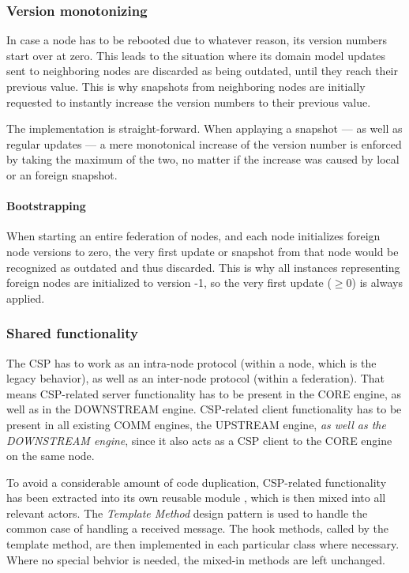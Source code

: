 \subsubsection{Version monotonizing}
In case a node has to be rebooted due to whatever reason, its version numbers
start over at zero.
This leads to the situation where its domain model updates sent to neighboring
nodes are discarded as being outdated, until they reach their previous value.
This is why snapshots from neighboring nodes are initially requested to
instantly increase the version numbers to their previous value.

The implementation is straight-forward. When applaying a snapshot --- as well as regular
updates --- a mere monotonical increase of the version number is enforced by
taking the maximum of the two, no matter if the increase was caused by local or
an foreign snapshot.

\paragraph{Bootstrapping}
When starting an entire federation of nodes, and each node initializes foreign
node versions to zero, the very first update or snapshot from that node would
be recognized as outdated and thus discarded. This is why all
 instances representing foreign nodes are
initialized to version -1, so the very first update ($\geqslant 0$) is always
applied.

\subsubsection{Shared functionality}
The \gls{CSP} has to work as an intra-node protocol (within a node, which is
the legacy behavior), as well as an inter-node protocol (within a federation).
That means \gls{CSP}-related server functionality has to be present in the CORE
engine, as well as in the DOWNSTREAM engine. CSP-related client functionality has
to be present in all existing COMM engines, the UPSTREAM engine, \emph{as well
as the DOWNSTREAM engine}, since it also acts as a CSP client to the CORE engine on
the same node.

To avoid a considerable amount of code duplication, CSP-related functionality
has been extracted into its own reusable module , which is then mixed into all
relevant actors. The \emph{Template Method} design pattern is used to handle
the common case of handling a received
 message. The hook methods,
called by the template method, are then implemented
in each particular class where necessary. Where no special behvior is needed,
the mixed-in methods are left unchanged.

